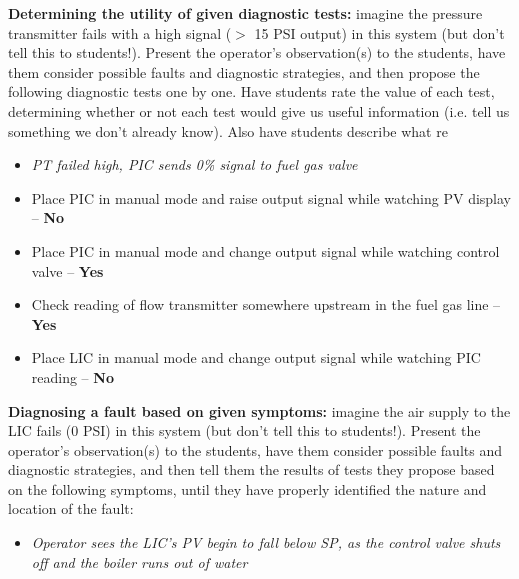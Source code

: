 \vskip 10pt


\noindent
{\bf Determining the utility of given diagnostic tests:} imagine the pressure transmitter fails with a high signal ($>$ 15 PSI output) in this system (but don't tell this to students!).  Present the operator's observation(s) to the students, have them consider possible faults and diagnostic strategies, and then propose the following diagnostic tests one by one.  Have students rate the value of each test, determining whether or not each test would give us useful information (i.e. tell us something we don't already know).  Also have students describe what re

\begin{itemize}
\item{} {\it PT failed high, PIC sends 0\% signal to fuel gas valve}
\item{} Place PIC in manual mode and raise output signal while watching PV display -- {\bf No}
\item{} Place PIC in manual mode and change output signal while watching control valve -- {\bf Yes}
\item{} Check reading of flow transmitter somewhere upstream in the fuel gas line -- {\bf Yes}
\item{} Place LIC in manual mode and change output signal while watching PIC reading -- {\bf No}
\end{itemize}


\vskip 10pt


\noindent
{\bf Diagnosing a fault based on given symptoms:} imagine the air supply to the LIC fails (0 PSI) in this system (but don't tell this to students!).  Present the operator's observation(s) to the students, have them consider possible faults and diagnostic strategies, and then tell them the results of tests they propose based on the following symptoms, until they have properly identified the nature and location of the fault:

\begin{itemize}
\item{} {\it Operator sees the LIC's PV begin to fall below SP, as the control valve shuts off and the boiler runs out of water}
\end{itemize}




